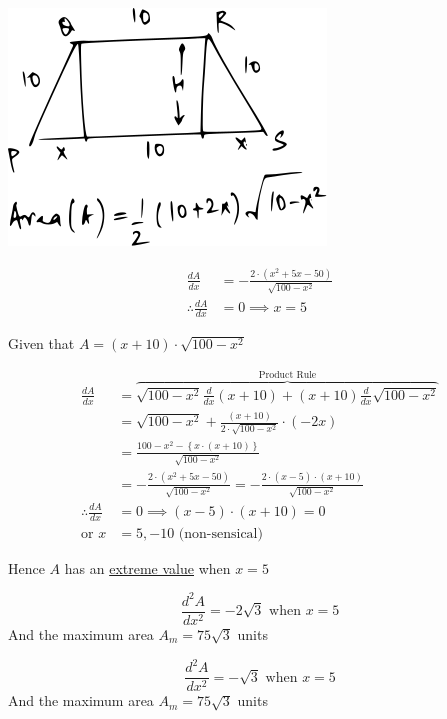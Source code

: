 \documentclass[14pt,fleqn]{extarticle}
\newcommand\ea{100-x^2}
\newcommand\es{\sqrt{\ea}}
\newcommand\eb{\left(x+10 \right)}
\begin{document}
\newcard

\begin{center} 
\includegraphics[scale=1.5]{img_prefab-1.svg} 
\end{center} 

\newcard

\begin{align}
	\frac{dA}{dx} &= - \frac{2\cdot \left(x^2 + 5x-50 \right)}{\es} \\
	\therefore \frac{dA}{dx} &=0 \implies x = 5 
\end{align}

\newcard 

Given that $A = \eb\cdot\es$

\begin{align}
\frac{dA}{dx} &= \overbrace{\es \frac{d}{dx}\eb + \eb \frac{d}{dx}\es}^{\text{Product Rule}} \\
&= \es + \frac{\eb}{2\cdot \es}\cdot \left(-2x \right) \\
&= \frac{\ea - \left\lbrace x\cdot \eb\right\rbrace}{\es} \\
&= -\frac{2\cdot \left(x^2+5x-50 \right)}{\es} = - \frac{2\cdot (x-5)\cdot (x+10)}{\es} \\
\therefore \frac{dA}{dx} &= 0 \implies (x-5)\cdot (x+10) = 0 \\
\text{or } x &= 5, -10\text{ (non-sensical)}
\end{align} 

Hence $A$ has an \underline{extreme value} when $x=5$

\newcard 

\[ \frac{d^2 A}{dx^2} = -2\sqrt{3} \text{ when } x = 5 \]
And the maximum area $A_m = 75\sqrt{3}$ units 

\newcard 

\[ \frac{d^2 A}{dx^2} = -\sqrt{3} \text{ when } x = 5 \]
And the maximum area $A_m = 75\sqrt{3}$ units 

\newcard 
\end{document}
